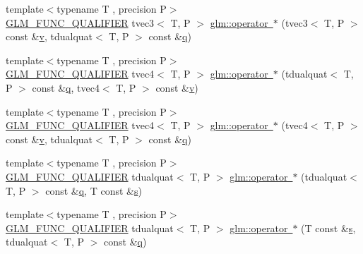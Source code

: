 \begin{DoxyCompactItemize}
\item 
{\footnotesize template$<$typename T , precision P$>$ }\\\mbox{\hyperlink{setup_8hpp_a33fdea6f91c5f834105f7415e2a64407}{G\+L\+M\+\_\+\+F\+U\+N\+C\+\_\+\+Q\+U\+A\+L\+I\+F\+I\+ER}} tvec3$<$ T, P $>$ \mbox{\hyperlink{group__gtx__dual__quaternion_ga025428539d309a905ce2faeec7a35639}{glm\+::operator $\ast$}} (tvec3$<$ T, P $>$ const \&\mbox{\hyperlink{glad_8h_a14cfbe2fc2234f5504618905b69d1e06}{v}}, tdualquat$<$ T, P $>$ const \&\mbox{\hyperlink{glad_8h_a514729309336df22bcc8eda979d6ced4}{q}})
\item 
{\footnotesize template$<$typename T , precision P$>$ }\\\mbox{\hyperlink{setup_8hpp_a33fdea6f91c5f834105f7415e2a64407}{G\+L\+M\+\_\+\+F\+U\+N\+C\+\_\+\+Q\+U\+A\+L\+I\+F\+I\+ER}} tvec4$<$ T, P $>$ \mbox{\hyperlink{group__gtx__dual__quaternion_gaf32d1192c854e65c73fe7815e4177e8d}{glm\+::operator $\ast$}} (tdualquat$<$ T, P $>$ const \&\mbox{\hyperlink{glad_8h_a514729309336df22bcc8eda979d6ced4}{q}}, tvec4$<$ T, P $>$ const \&\mbox{\hyperlink{glad_8h_a14cfbe2fc2234f5504618905b69d1e06}{v}})
\item 
{\footnotesize template$<$typename T , precision P$>$ }\\\mbox{\hyperlink{setup_8hpp_a33fdea6f91c5f834105f7415e2a64407}{G\+L\+M\+\_\+\+F\+U\+N\+C\+\_\+\+Q\+U\+A\+L\+I\+F\+I\+ER}} tvec4$<$ T, P $>$ \mbox{\hyperlink{group__gtx__dual__quaternion_ga86c03ef63303143897cb83fa308a459c}{glm\+::operator $\ast$}} (tvec4$<$ T, P $>$ const \&\mbox{\hyperlink{glad_8h_a14cfbe2fc2234f5504618905b69d1e06}{v}}, tdualquat$<$ T, P $>$ const \&\mbox{\hyperlink{glad_8h_a514729309336df22bcc8eda979d6ced4}{q}})
\item 
{\footnotesize template$<$typename T , precision P$>$ }\\\mbox{\hyperlink{setup_8hpp_a33fdea6f91c5f834105f7415e2a64407}{G\+L\+M\+\_\+\+F\+U\+N\+C\+\_\+\+Q\+U\+A\+L\+I\+F\+I\+ER}} tdualquat$<$ T, P $>$ \mbox{\hyperlink{group__gtx__dual__quaternion_ga4a6cc7370cdc034ece6e7f948a67979b}{glm\+::operator $\ast$}} (tdualquat$<$ T, P $>$ const \&\mbox{\hyperlink{glad_8h_a514729309336df22bcc8eda979d6ced4}{q}}, T const \&\mbox{\hyperlink{glad_8h_af1b1d5edfea6a34daee7389b1b5810ad}{s}})
\item 
{\footnotesize template$<$typename T , precision P$>$ }\\\mbox{\hyperlink{setup_8hpp_a33fdea6f91c5f834105f7415e2a64407}{G\+L\+M\+\_\+\+F\+U\+N\+C\+\_\+\+Q\+U\+A\+L\+I\+F\+I\+ER}} tdualquat$<$ T, P $>$ \mbox{\hyperlink{group__gtx__dual__quaternion_ga95c5286c40784455b0130b2880e99f72}{glm\+::operator $\ast$}} (T const \&\mbox{\hyperlink{glad_8h_af1b1d5edfea6a34daee7389b1b5810ad}{s}}, tdualquat$<$ T, P $>$ const \&\mbox{\hyperlink{glad_8h_a514729309336df22bcc8eda979d6ced4}{q}})

\end{DoxyCompactItemize}
